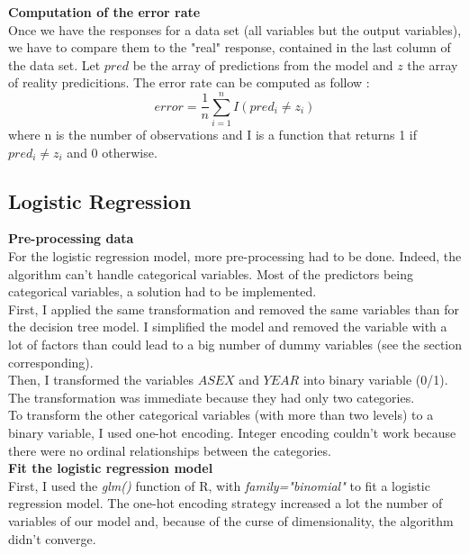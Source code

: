 \documentclass{article}
\begin{document}
\vspace{0.5cm}
\noindent\textbf{Computation of the error rate} \\

\noindent Once we have the responses for a data set (all variables but the output variables), we have to compare them to the "real" response, contained in the last column of the data set. Let $pred$ be the array of predictions from the model and $z$ the array of reality predicitions. The error rate can be computed as follow : \\

$$error = \frac{1}{n}\sum_{i=1}^{n}I(pred_i \neq z_i)$$
\noindent where n is the number of observations and I is a function that returns 1 if $pred_i \neq z_i$ and 0 otherwise.\\

\subsection{Logistic Regression}
\noindent\textbf{Pre-processing data} \\

\noindent For the logistic regression model, more pre-processing had to be done. Indeed, the algorithm can't handle categorical variables. Most of the predictors being categorical variables, a solution had to be implemented.\\

\noindent First, I applied the same transformation and removed the same variables than for the decision tree model. I simplified the model and removed the variable with a lot of factors than could lead to a big number of dummy variables (see the section corresponding).\\

\noindent Then, I transformed the variables $ASEX$ and $YEAR$ into binary variable (0/1). The transformation was immediate because they had only two categories. \\
\noindent To transform the other categorical variables (with more than two levels) to a binary variable, I used one-hot encoding. Integer encoding couldn't work because there were no ordinal relationships between the categories. \\

\noindent\textbf{Fit the logistic regression model} \\

\noindent First, I used the \textit{glm()} function of R, with \textit{family="binomial"} to fit a logistic regression model. The one-hot encoding strategy increased a lot the number of variables of our model and, because of the curse of dimensionality, the algorithm didn't converge. \\
\end{document}
